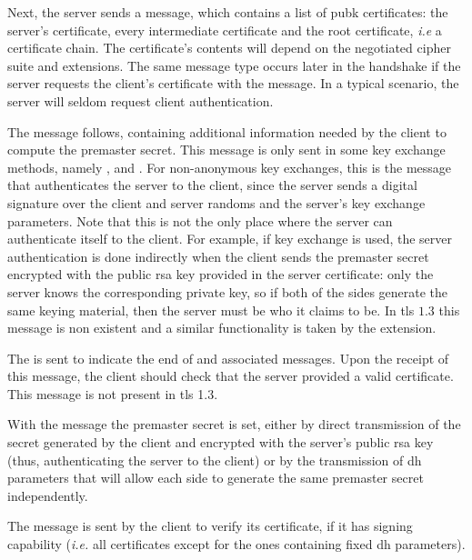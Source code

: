 \documentclass{llncs}
\begin{document}
Next, the server sends a  message, which contains a list
of \gls{pubk} certificates: the server's certificate,
every intermediate certificate and the root certificate, \textit{i.e} a certificate chain. The certificate's contents
will depend on the negotiated cipher suite and extensions.
The same message type occurs later in the handshake if the server requests the client's certificate with the
 message. In a typical scenario, the
server will seldom request client authentication.

The  message follows, containing additional information
needed by the client to compute the premaster secret. This message
is only sent in some key exchange methods, namely , 
and . For non-anonymous key exchanges, this is the message that authenticates the server to the client,
since the server sends a digital signature over the client and server randoms
and the server's key exchange parameters. Note that this is not the only place where the
server can authenticate itself to the client. For example, if  key
exchange is used, the server authentication is done indirectly when the client
sends the premaster secret encrypted with the public \gls{rsa} key provided in the
server certificate: only the server knows the corresponding private key, so if
both of the sides generate the same keying material, then the server must be who
it claims to be. In \gls{tls} $1.3$ this message is non existent and a similar
functionality is taken by the  extension.

The  is sent to indicate the end of 
and associated messages. Upon the receipt of this message, the client should check
that the server provided a valid certificate. This message is not present in \gls{tls} 1.3.

With the  message the premaster secret is
set, either by direct transmission of the secret generated by the client
and encrypted with the server's public \gls{rsa} key (thus, authenticating the server to the client)
or by the transmission of \gls{dh} parameters that will allow each side to generate
the same premaster secret independently.

The  message is sent by the client to verify its
certificate, if it has signing capability (\textit{i.e.} all certificates except for the ones
containing fixed \gls{dh} parameters).
\end{document}
